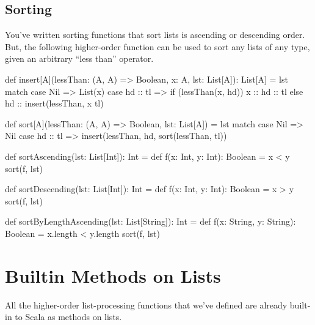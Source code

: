 \documentclass{book}
\begin{document}


\subsection{Sorting}

You've written sorting functions that sort lists is ascending or descending
order. But, the following higher-order function can be used to sort any
lists of any type, given an arbitrary ``less than'' operator.

\begin{scalacode}
def insert[A](lessThan: (A, A) => Boolean, x: A, lst: List[A]): List[A] = lst match {
  case Nil => List(x)
  case hd :: tl => {
    if (lessThan(x, hd)) {
      x :: hd :: tl
    }
    else {
      hd :: insert(lessThan, x tl)
    }
  }
}

def sort[A](lessThan: (A, A) => Boolean, lst: List[A]) = lst match {
  case Nil => Nil
  case hd :: tl => insert(lessThan, hd, sort(lessThan, tl))
}

def sortAscending(lst: List[Int]): Int = {
  def f(x: Int, y: Int): Boolean = x < y
  sort(f, lst)
}

def sortDescending(lst: List[Int]): Int = {
  def f(x: Int, y: Int): Boolean = x > y
  sort(f, lst)
}

def sortByLengthAscending(lst: List[String]): Int = {
  def f(x: String, y: String): Boolean = x.length < y.length
  sort(f, lst)
}
\end{scalacode}

\section{Builtin Methods on Lists}

All the higher-order list-processing functions that we've defined are already
built-in to Scala as methods on lists.
\end{document}
